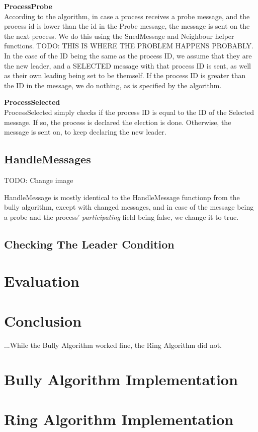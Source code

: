 \documentclass{report}
\begin{document}
\textbf{ProcessProbe}\\
According to the algorithm, in case a process receives a probe message, and the process id is lower than the id in the Probe message, the message is sent on the the next process. We do this using the SnedMessage and Neighbour helper functions. TODO: THIS IS WHERE THE PROBLEM HAPPENS PROBABLY. In the case of the ID being the same as the process ID, we assume that they are the new leader, and a SELECTED message with that process ID is sent, as well as their own leading being set to be themself. If the process ID is greater than the ID in the message, we do nothing, as is specified by the algorithm.

\textbf{ProcessSelected}\\
ProcessSelected simply checks if the process ID is equal to the ID of the Selected message. If so, the process is declared the election is done. Otherwise, the message is sent on, to keep declaring the new leader.


\section{HandleMessages}
\noindent{}
TODO: Change image

HandleMessage is mostly identical to the HandleMessage functionp from the bully algorithm, except with changed messages, and in case of the message being a probe and the process' \textit{participating} field being false, we change it to true.

\section{Checking The Leader Condition}



\chapter{Evaluation}



\chapter{Conclusion}

...While the Bully Algorithm worked fine, the Ring Algorithm did not.



\appendix

\chapter{Bully Algorithm Implementation}



\chapter{Ring Algorithm Implementation}
\end{document}
